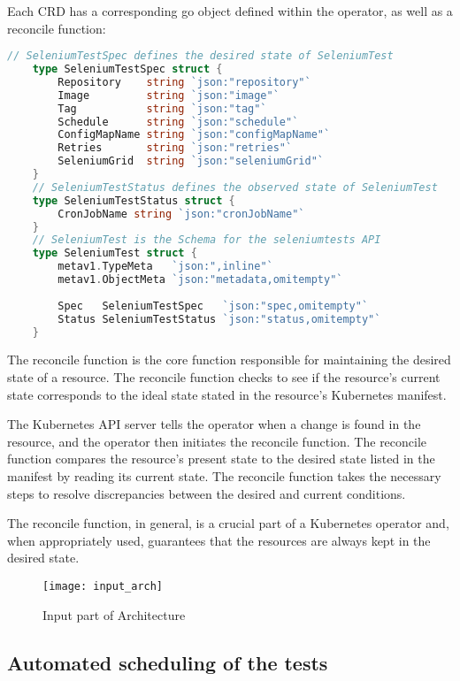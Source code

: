 Each CRD has a corresponding go object defined within the operator, as well as a reconcile function:
\begin{lstlisting}[language={Go}]
	// SeleniumTestSpec defines the desired state of SeleniumTest
	type SeleniumTestSpec struct {
		Repository    string `json:"repository"`
		Image         string `json:"image"`
		Tag           string `json:"tag"`
		Schedule      string `json:"schedule"`
		ConfigMapName string `json:"configMapName"`
		Retries       string `json:"retries"`
		SeleniumGrid  string `json:"seleniumGrid"`
	}
	// SeleniumTestStatus defines the observed state of SeleniumTest
	type SeleniumTestStatus struct {
		CronJobName string `json:"cronJobName"`
	}
	// SeleniumTest is the Schema for the seleniumtests API
	type SeleniumTest struct {
		metav1.TypeMeta   `json:",inline"`
		metav1.ObjectMeta `json:"metadata,omitempty"`
	
		Spec   SeleniumTestSpec   `json:"spec,omitempty"`
		Status SeleniumTestStatus `json:"status,omitempty"`
	}
\end{lstlisting}

The reconcile function is the core function responsible for maintaining the desired state of a resource. The reconcile function checks to see if the resource's current state corresponds to the ideal state stated in the resource's Kubernetes manifest.

The Kubernetes API server tells the operator when a change is found in the resource, and the operator then initiates the reconcile function. The reconcile function compares the resource's present state to the desired state listed in the manifest by reading its current state. The reconcile function takes the necessary steps to resolve discrepancies between the desired and current conditions.

The reconcile function, in general, is a crucial part of a Kubernetes operator and, when appropriately used, guarantees that the resources are always kept in the desired state.

\begin{figure}[H]
	\centering
	\texttt{[image: input\_arch]}
	\label{fig:input_arch}
	\caption{Input part of Architecture}
\end{figure}

\subsection{Automated scheduling of the tests}

